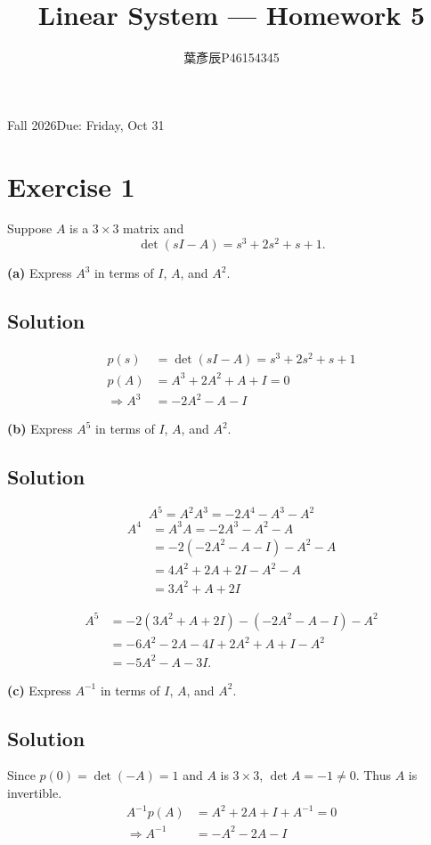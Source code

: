 \documentclass[12pt,a4paper]{article}
\title{Linear System --- Homework 5}
\author{葉彥辰\quad P46154345}
\date{}
\begin{document}
\maketitle
\begin{center}Fall 2026\quad Due: Friday, Oct 31\end{center}

\section*{Exercise 1}
Suppose $A$ is a $3\times 3$ matrix and
\[
\det(sI-A)=s^3+2s^2+s+1.
\]

\needspace{6cm}
\textbf{(a)} Express $A^3$ in terms of $I$, $A$, and $A^2$.
\subsection*{Solution}

\begin{align*}
	p(s) &= \det (sI - A) = s^3 + 2s^2 + s + 1 \\
	p(A) &= A^3 + 2A^2 + A + I  = 0\\
	\Rightarrow A^3 &= -2A^2 -A-I
\end{align*}

\textbf{(b)} Express $A^5$ in terms of $I$, $A$, and $A^2$.
\subsection*{Solution}

\[
A^5 = A^2 A^3 = -2A^4 - A^3 - A^2
\]
\begin{align*}
A^4 &= A^3A = -2A^3 - A^2 - A  \\
&= -2( -2A^2 -A-I) - A^2 - A \\
&= 4A^2 + 2A + 2I -A^2 - A \\
&=3A^2 + A + 2I
\end{align*}

\begin{align*}
A^5 &= -2 (3A^2 + A +2I) - (-2A^2 - A - I) - A^2 \\
    &= -6A^2 -2A -4I + 2A^2 +A + I - A^2 \\
    &= -5A^2-A-3I.
\end{align*}
\vspace{0.5cm}


\textbf{(c)} Express $A^{-1}$ in terms of $I$, $A$, and $A^2$.
\subsection*{Solution}
Since $p(0)=\det(-A)=1$ and $A$ is $3\times3$, $\det A=-1\ne0$.
Thus $A$ is invertible.
\begin{align*}
	A^{-1}p(A) &= A^2 + 2A + I + A^{-1} = 0 \\
	\Rightarrow A^{-1} &= -A^2 - 2A - I
\end{align*}
\end{document}
